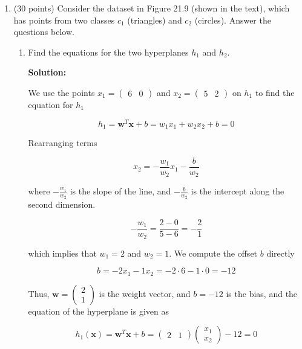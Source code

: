 \documentclass[11pt]{article}
\begin{document}
\begin{enumerate}
\begin{enumerate}
\end{enumerate}

\item (30 points) Consider the dataset in Figure 21.9 (shown in the text), which has points from two classes $c_1$ (triangles) and $c_2$ (circles). Answer the questions below.

\begin{enumerate}
\item Find the equations for the two hyperplanes $h_1$ and $h_2$.

\textbf{Solution:}

We use the points $x_1 = (\begin{array}{cc}6 & 0 \end{array})$ and $x_2 = (\begin{array}{cc}5 & 2 \end{array})$ on $h_1$ to find the equation for $h_1$

\begin{equation*}
h_1 = \mathbf{w}^\mathit{T} \mathbf{x} + b = w_1 x_1 + w_2 x_2 + b = 0
\end{equation*}

Rearranging terms

\begin{equation*}
x_2 = - \frac{w_1}{w_2} x_1 - \frac{b}{w_2}
\end{equation*}

where $- \frac{w_1}{w_2}$ is the slope of the line, and $- \frac{b}{w_2}$ is the intercept along the second dimension.

\begin{equation*}
-\frac{w_1}{w_2} = \frac{2-0}{5-6} = -\frac{2}{1}
\end{equation*}

which implies that $w_1 = 2$ and $w_2 = 1$. We compute the offset $b$ directly

\begin{equation*}
b = - 2 x_1 - 1 x_2 = -2 \cdot 6 - 1 \cdot 0 = -12
\end{equation*}

Thus, $\mathbf{w} = \left( \begin{array}{c} 2 \\ 1 \end{array} \right)$ is the weight vector, and $b = -12$ is the bias, and the equation of the hyperplane is given as

\begin{equation*}
h_1(\mathbf{x}) = \mathbf{w}^\mathit{T} \mathbf{x} + b = (\begin{array}{cc} 2 & 1 \end{array}) \left( \begin{array}{c} x_1 \\ x_2 \end{array} \right) - 12 = 0
\end{equation*}


\end{enumerate}
\end{enumerate}
\end{document}
